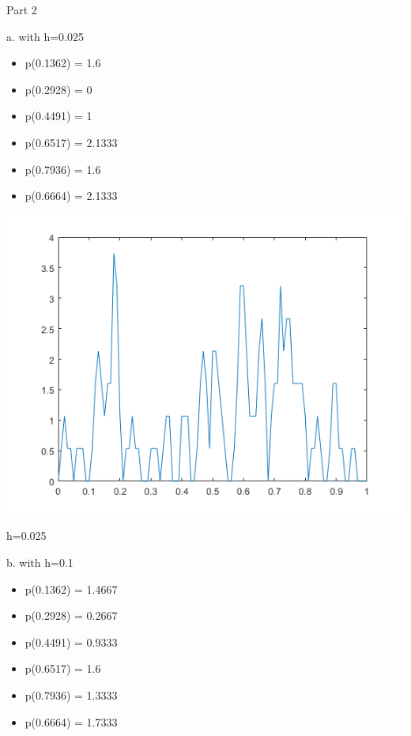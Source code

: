 \documentclass[a4paper]{article}
\begin{document}
Part 2

a.
with h=0.025
\begin{itemize}
    \item p(0.1362) = 1.6
    \item p(0.2928) = 0
    \item p(0.4491) = 1
    \item p(0.6517) = 2.1333
    \item p(0.7936) = 1.6
    \item p(0.6664) = 2.1333
\end{itemize}

\begin{center}
    \includegraphics[scale=1]{3a.png}
    \caption{h=0.025}
\end{center}

b. 
with h=0.1
\begin{itemize}
    \item p(0.1362) = 1.4667
    \item p(0.2928) = 0.2667
    \item p(0.4491) = 0.9333
    \item p(0.6517) = 1.6
    \item p(0.7936) = 1.3333
    \item p(0.6664) = 1.7333
\end{itemize}
\end{document}
